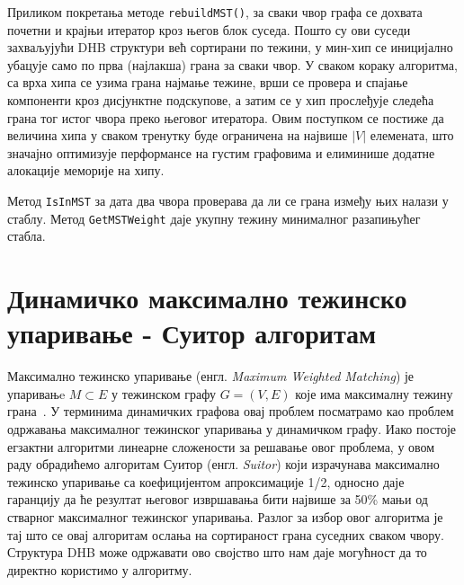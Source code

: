 Приликом покретања методе \texttt{rebuildMST()}, за сваки чвор графа се дохвата почетни и крајњи итератор кроз његов блок суседа. Пошто су ови суседи захваљујући DHB структури већ сортирани по тежини, у мин-хип се иницијално убацује само по прва (најлакша) грана за сваки чвор. У сваком кораку алгоритма, са врха хипа се узима грана најмање тежине, врши се провера и спајање компоненти кроз дисјунктне подскупове, а затим се у хип прослеђује следећа грана тог истог чвора преко његовог итератора. Овим поступком се постиже да величина хипа у сваком тренутку буде ограничена на највише $|V|$ елемената, што значајно оптимизује перформансе на густим графовима и елиминише додатне алокације меморије на хипу.

Метод \texttt{IsInMST} за дата два чвора проверава да ли се грана између њих налази у стаблу. Метод \texttt{GetMSTWeight} даје укупну тежину минималног разапињућег стабла.

\section{Динамичко максимално тежинско упаривање - Суитор алгоритам}

Максимално тежинско упаривање (енгл. \textit{Maximum Weighted Matching}) је упаривањe $M\subset E$ у тежинском графу $G=(V,E)$ које има максималну тежину грана~\cite{angrimanBatchdynamicSuitorAlgorithm2022}. У терминима динамичких графова овај проблем посматрамо као проблем одржавања максималног тежинског упаривања у динамичком графу. Иако постоје егзактни алгоритми линеарне сложености за решавање овог проблема, у овом раду обрадићемо алгоритам Суитор (енгл. \textit{Suitor}) који израчунава максимално тежинско упаривање са коефицијентом апроксимације 1/2, односно даје гаранцију да ће резултат његовог извршавања бити највише за 50\% мањи од стварног максималног тежинског упаривања. Разлог за избор овог алгоритма је тај што се овај алгоритам ослања на сортираност грана суседних сваком чвору. Структура DHB може одржавати ово својство што нам даје могућност да то директно користимо у алгоритму. 


